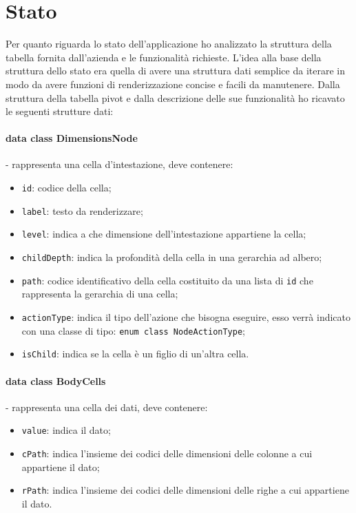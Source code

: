 \section{Stato}
Per quanto riguarda lo stato dell'applicazione ho analizzato la struttura della tabella fornita dall'azienda e le funzionalità richieste. L'idea alla base della struttura dello stato era quella di avere una struttura dati semplice da iterare in modo da avere funzioni di renderizzazione concise e facili da manutenere. Dalla struttura della tabella pivot e dalla descrizione delle sue funzionalità ho ricavato le seguenti strutture dati:
\paragraph*{data class DimensionsNode}- rappresenta una cella d'intestazione, deve contenere:
\begin{itemize}
	\item \verb|id|: codice della cella;
	\item \verb|label|: testo da renderizzare;
	\item \verb|level|: indica a che dimensione dell'intestazione appartiene la cella;
	\item \verb|childDepth|: indica la profondità della cella in una gerarchia ad albero;
	\item \verb|path|: codice identificativo della cella costituito da una lista di \verb|id| che rappresenta la gerarchia di una cella;
	\item \verb|actionType|: indica il tipo dell'azione che bisogna eseguire, esso verrà indicato con una classe di tipo: \verb|enum class NodeActionType|;
	\item \verb|isChild|: indica se la cella è un figlio di un'altra cella.
\end{itemize}

\paragraph*{data class BodyCells}- rappresenta una cella dei dati, deve contenere:
\begin{itemize}
	\item \verb|value|: indica il dato;
	\item \verb|cPath|: indica l'insieme dei codici delle dimensioni delle colonne a cui appartiene il dato;
	\item \verb|rPath|: indica l'insieme dei codici delle dimensioni delle righe a cui appartiene il dato.
\end{itemize}	

